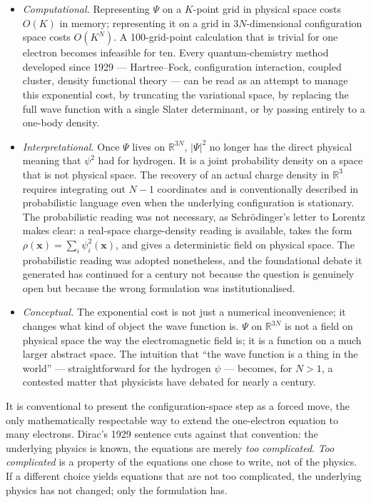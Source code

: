 \begin{itemize}
\item \emph{Computational.} Representing $\Psi$ on a $K$-point grid in physical space costs $O(K)$ in memory; representing it on a grid in $3N$-dimensional configuration space costs $O(K^N)$. A 100-grid-point calculation that is trivial for one electron becomes infeasible for ten. Every quantum-chemistry method developed since 1929 --- Hartree--Fock, configuration interaction, coupled cluster, density functional theory --- can be read as an attempt to manage this exponential cost, by truncating the variational space, by replacing the full wave function with a single Slater determinant, or by passing entirely to a one-body density.

\item \emph{Interpretational.} Once $\Psi$ lives on $\mathbb{R}^{3N}$, $|\Psi|^2$ no longer has the direct physical meaning that $\psi^2$ had for hydrogen. It is a joint probability density on a space that is not physical space. The recovery of an actual charge density in $\mathbb{R}^3$ requires integrating out $N-1$ coordinates and is conventionally described in probabilistic language even when the underlying configuration is stationary. The probabilistic reading was not necessary, as Schr\"odinger's letter to Lorentz makes clear: a real-space charge-density reading is available, takes the form $\rho(\mathbf{x}) = \sum_i \psi_i^2(\mathbf{x})$, and gives a deterministic field on physical space. The probabilistic reading was adopted nonetheless, and the foundational debate it generated has continued for a century not because the question is genuinely open but because the wrong formulation was institutionalised.

\item \emph{Conceptual.} The exponential cost is not just a numerical inconvenience; it changes what kind of object the wave function is. $\Psi$ on $\mathbb{R}^{3N}$ is not a field on physical space the way the electromagnetic field is; it is a function on a much larger abstract space. The intuition that ``the wave function is a thing in the world'' --- straightforward for the hydrogen $\psi$ --- becomes, for $N>1$, a contested matter that physicists have debated for nearly a century.
\end{itemize}

It is conventional to present the configuration-space step as a forced move, the only mathematically respectable way to extend the one-electron equation to many electrons. Dirac's 1929 sentence cuts against that convention: the underlying physics is known, the equations are merely \emph{too complicated}. \emph{Too complicated} is a property of the equations one chose to write, not of the physics. If a different choice yields equations that are not too complicated, the underlying physics has not changed; only the formulation has.

